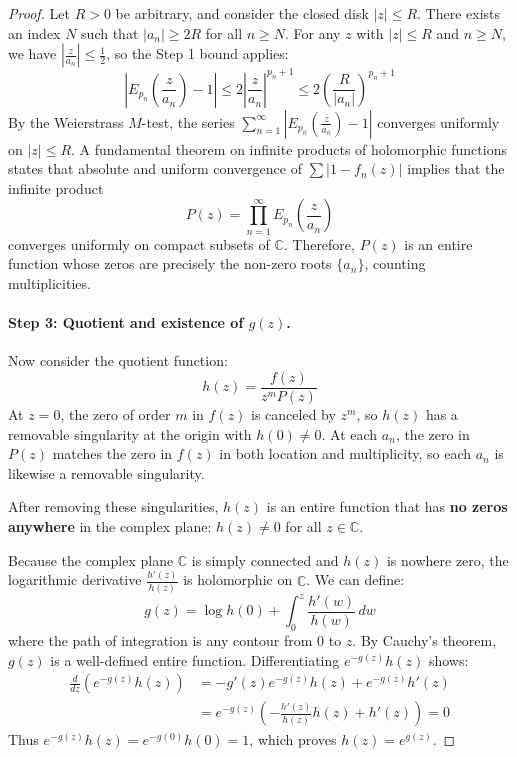 \documentclass[a4paper]{article}
\begin{document}
\begin{theorem}
\begin{proof}
Let $R > 0$ be arbitrary, and consider the closed disk $|z| \leq R$. There exists an index $N$ such that $|a_n| \geq 2R$ for all $n \geq N$. For any $z$ with $|z| \leq R$ and $n \geq N$, we have $\left| \frac{z}{a_n} \right| \leq \frac{1}{2}$, so the Step 1 bound applies:
\begin{equation*}
\left| E_{p_n}\left( \frac{z}{a_n} \right) - 1 \right| \leq 2 \left| \frac{z}{a_n} \right|^{p_n + 1} \leq 2 \left( \frac{R}{|a_n|} \right)^{p_n + 1}
\end{equation*}
By the Weierstrass $M$-test, the series $\sum_{n=1}^{\infty} \left| E_{p_n}\left(\frac{z}{a_n}\right) - 1 \right|$ converges uniformly on $|z| \leq R$. 
A fundamental theorem on infinite products of holomorphic functions states that absolute and uniform convergence of $\sum |1 - f_n(z)|$ implies that the infinite product
\begin{equation*}
P(z) = \prod_{n=1}^{\infty} E_{p_n}\left( \frac{z}{a_n} \right)
\end{equation*}
converges uniformly on compact subsets of $\mathbb{C}$. Therefore, $P(z)$ is an entire function whose zeros are precisely the non-zero roots $\{a_n\}$, counting multiplicities.

\paragraph{Step 3: Quotient and existence of $g(z)$.}
Now consider the quotient function:
\begin{equation*}
h(z) = \frac{f(z)}{z^m P(z)}
\end{equation*}
At $z = 0$, the zero of order $m$ in $f(z)$ is canceled by $z^m$, so $h(z)$ has a removable singularity at the origin with $h(0) \neq 0$. At each $a_n$, the zero in $P(z)$ matches the zero in $f(z)$ in both location and multiplicity, so each $a_n$ is likewise a removable singularity. 

After removing these singularities, $h(z)$ is an entire function that has \textbf{no zeros anywhere} in the complex plane: $h(z) \neq 0$ for all $z \in \mathbb{C}$.

Because the complex plane $\mathbb{C}$ is simply connected and $h(z)$ is nowhere zero, the logarithmic derivative $\frac{h'(z)}{h(z)}$ is holomorphic on $\mathbb{C}$. We can define:
\begin{equation*}
g(z) = \log h(0) + \int_{0}^{z} \frac{h'(w)}{h(w)} \, dw
\end{equation*}
where the path of integration is any contour from $0$ to $z$. By Cauchy's theorem, $g(z)$ is a well-defined entire function. Differentiating $e^{-g(z)} h(z)$ shows:
\begin{align*}
\frac{d}{dz} \left( e^{-g(z)} h(z) \right) &= -g'(z) e^{-g(z)} h(z) + e^{-g(z)} h'(z) \\
&= e^{-g(z)} \left( - \frac{h'(z)}{h(z)} h(z) + h'(z) \right) = 0
\end{align*}
Thus $e^{-g(z)} h(z) = e^{-g(0)} h(0) = 1$, which proves $h(z) = e^{g(z)}$. 


\end{proof}
\end{theorem}
\end{document}
